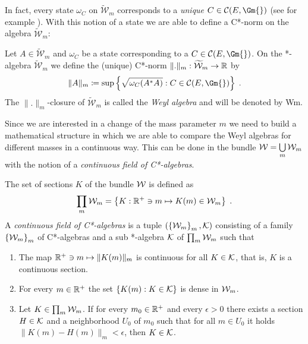 In fact, every state $\omega_C$ on $\widetilde{\mathcal{W}}_m $ corresponds to a \emph{unique} $C \in \mathcal{C}(E,\Gm{})$	(see for example \cite[Chapter 3]{rieckers_honegger_deformation}). With this notion of a state we are able to define a C*-norm on the algebra $\widetilde{\mathcal{W}}_m$:
%
%
\begin{definition}
	Let $A \in \widetilde{\mathcal{W}}_m$ and $\omega_C$ be a state corresponding to a $C \in \mathcal{C}(E,\Gm{})$. On the *-algebra $\widetilde{\mathcal{W}}_m$ we define the (unique) C*-norm $\| . \|_m : \widetilde{\mathcal{W}}_m \to \mathbb{R}$ by
	\begin{align}
		\| A \|_m \coloneqq \sup\left\{\sqrt{\omega_C(A^* A)} : C \in \mathcal{C}(E,\Gm{})\right\} \formspace.
	\end{align}
	The $\|.\|_m$-closure of $\widetilde{\mathcal{W}}_m$ is called the \emph{Weyl algebra} and will be denoted by \gls{Wm}.
\end{definition}
\noindent Since we are interested in a change of the mass parameter $m$ we need to build a mathematical structure in which we are able to compare the Weyl algebras for different masses in a continuous way. This can be done in the bundle $\mathcal{W} = \bigcup\limits_m \mathcal{W}_m$ with the notion of a \emph{continuous field of C*-algebras}. 
\begin{definition}\label{def:continous_field_algebra}
	The set of sections $K$ of the bundle $\mathcal{W}$ is defined as
	\begin{align}
		\prod_{m} \mathcal{W}_m = \left\{ K : \mathbb{R}^+ \ni m \mapsto K(m) \in \mathcal{W}_m \right\} \;.
	\end{align}	
	A \emph{continuous field of C*-algebras} is a tuple $(\left\{ \mathcal{W}_m \right\}_m , \mathcal{K})$ consisting of a family $\left\{ \mathcal{W}_m \right\}_m $ of C*-algebras and a sub *-algebra $\mathcal{K}$ of $\prod_{m} \mathcal{W}_m$ such that
	\begin{enumerate}
		\item The map $\mathbb{R}^+ \ni m \mapsto \|K(m)\|_m$ is continuous for all $K \in \mathcal{K}$, that is, $K$ is a continuous section.
		\item For every $m \in \mathbb{R}^+$ the set $\left\{ K(m) : K \in \mathcal{K} \right\}$ is dense in $\mathcal{W}_m$.
		\item Let $K \in \prod_{m} \mathcal{W}_m $. If for every $m_0 \in \mathbb{R}^+$ and every $\epsilon > 0$ there exists a section $H \in \mathcal{K}$ and a neighborhood $U_0$ of $m_0$ such that for all $m \in U_0$ it holds $\| K(m) - H(m)\|_m < \epsilon$, then $K \in \mathcal{K}$.
	\end{enumerate}
\end{definition}
